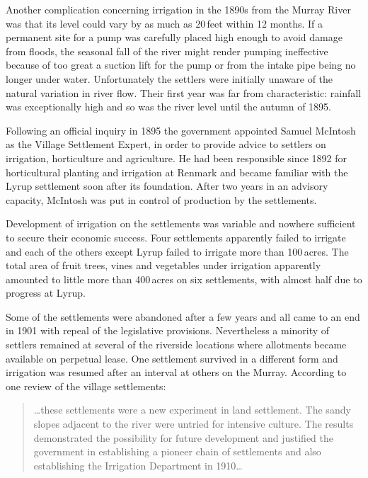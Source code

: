 Another complication concerning irrigation in the 1890s from the
Murray River  was that its level could vary by as
much as 20\,feet within 12 months.  If a permanent site for a pump was
carefully placed high enough to avoid damage from floods, the seasonal
fall of the river might render pumping ineffective because of too
great a suction lift for the pump or from the intake pipe being no
longer under water.  Unfortunately the settlers were initially unaware
of the natural variation in river flow.  Their first year was far from
characteristic: rainfall was exceptionally high and so was the river
level until the autumn of 1895.

Following an official inquiry in 1895 the government appointed
Sam\-uel McIntosh  as the Village Settlement
Expert, in order to provide advice to settlers on irrigation,
horticulture and agriculture. He had been responsible since 1892 for
horticultural planting and irrigation at Renmark and became familiar
with the Lyrup settlement soon after its foundation.  After two years
in an advisory capacity, McIntosh was put in control of production by
the settlements.

Development of irrigation on the settlements was variable and
no\-where sufficient to secure their economic success.  Four
settlements apparently failed to irrigate and each of the others
except Lyrup
 failed to irrigate more than 100\,acres. The total 
area of fruit trees, vines and vegetables under irrigation apparently
amounted to little more than 400\,acres on six settlements, with almost
half due to progress at Lyrup.

Some of the settlements were abandoned after a few years and all came
to an end in 1901 with repeal of the legislative provisions.
Nevertheless a minority of settlers remained at several of the
riverside locations where allotments became available on perpetual
lease.  One settlement survived in a different form and irrigation was
resumed after an interval at others on the Murray.  According to one
review of the village settlements:
\begin{quote}
	\ldots these settlements were a new experiment in land
	settlement.  The sandy slopes adjacent to the river were
	untried for intensive culture.  The results demonstrated the
	possibility for future development and justified the
	government in establishing a pioneer chain of settlements and
	also establishing the Irrigation Department in
	1910\ldots{}
\end{quote}

